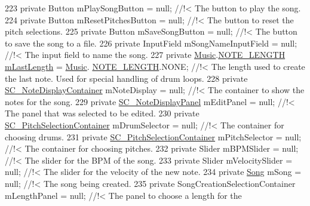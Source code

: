 \begin{DoxyCodeInclude}
223 \textcolor{comment}{}    \textcolor{keyword}{private} Button mPlaySongButton = null; \textcolor{comment}{//!< The button to play the song. }
224 \textcolor{comment}{}    \textcolor{keyword}{private} Button mResetPitchesButton = null; \textcolor{comment}{//!< The button to reset the pitch selections.}
225 \textcolor{comment}{}    \textcolor{keyword}{private} Button mSaveSongButton = null; \textcolor{comment}{//!< The button to save the song to a file.}
226 \textcolor{comment}{}    \textcolor{keyword}{private} InputField mSongNameInputField = null; \textcolor{comment}{//!< The input field to name the song.}
227 \textcolor{comment}{}    \textcolor{keyword}{private} \hyperlink{class_music}{Music}.\hyperlink{group___music_enums_gaf11b5f079adbb21c800b9eca1c5c3cbd}{NOTE\_LENGTH} \hyperlink{group___s_c_m_priv_var_gaa137adb1c99e9ee59adcfbf7d0cf6249}{mLastLength} = \hyperlink{class_music}{Music}.
      \hyperlink{group___music_enums_gaf11b5f079adbb21c800b9eca1c5c3cbd}{NOTE\_LENGTH}.NONE; \textcolor{comment}{//!< The length used to create the last note. Used for special handling of
       drum loops.}
228 \textcolor{comment}{}    \textcolor{keyword}{private} \hyperlink{class_s_c___note_display_container}{SC\_NoteDisplayContainer} mNoteDisplay = null; \textcolor{comment}{//!< The container to show
       the notes for the song.}
229 \textcolor{comment}{}    \textcolor{keyword}{private} \hyperlink{class_s_c___note_display_panel}{SC\_NoteDisplayPanel} mEditPanel = null; \textcolor{comment}{//!< The panel that was selected to
       be edited.}
230 \textcolor{comment}{}    \textcolor{keyword}{private} \hyperlink{class_s_c___pitch_selection_container}{SC\_PitchSelectionContainer} mDrumSelector = null; \textcolor{comment}{//!< The container
       for choosing drums.}
231 \textcolor{comment}{}    \textcolor{keyword}{private} \hyperlink{class_s_c___pitch_selection_container}{SC\_PitchSelectionContainer} mPitchSelector = null; \textcolor{comment}{//!< The container
       for choosing pitches.}
232 \textcolor{comment}{}    \textcolor{keyword}{private} Slider mBPMSlider = null; \textcolor{comment}{//!< The slider for the BPM of the song.}
233 \textcolor{comment}{}    \textcolor{keyword}{private} Slider mVelocitySlider = null; \textcolor{comment}{//!< The slider for the velocity of the new note.}
234 \textcolor{comment}{}    \textcolor{keyword}{private} \hyperlink{class_song}{Song} mSong = null; \textcolor{comment}{//!< The song being created.}
235 \textcolor{comment}{}    \textcolor{keyword}{private} SongCreationSelectionContainer mLengthPanel = null; \textcolor{comment}{//!< The panel to choose a length for the
}
\end{DoxyCodeInclude}

